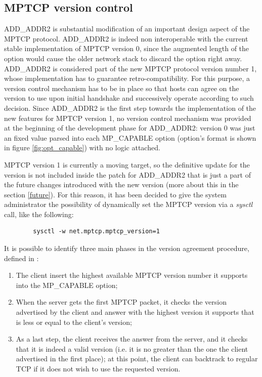 \subsection{MPTCP version control}
\label{retrocomp}
ADD\_ADDR2 is substantial modification of an important design aspect of the MPTCP protocol. ADD\_ADDR2 is indeed non interoperable with the current stable implementation of MPTCP version 0, since the augmented length of the option would cause the older network stack to discard the option right away.
ADD\_ADDR2 is considered part of the new MPTCP protocol version number 1, whose implementation has to guarantee retro-compatibility. For this purpose, a version control mechanism has to be in place so that hosts can agree on the version to use upon initial handshake and successively operate according to such decision. Since ADD\_ADDR2 is the first step towards the implementation of the new features for MPTCP version 1, no version control mechanism was provided at the beginning of the development phase for ADD\_ADDR2: version 0 was just an fixed value parsed into each MP\_CAPABLE option (option's format is shown in figure \ref{fig:opt_capable}) with no logic attached.

MPTCP version 1 is currently a moving target, so the definitive update for the version is not included inside the patch for ADD\_ADDR2 that is just a part of the future changes introduced with the new version (more about this in the section \ref{future}). For this reason, it has been decided to give the system administrator the possibility of dynamically set the MPTCP version via a \textit{sysctl} call, like the following:

\begin{verbatim}
        sysctl -w net.mptcp.mptcp_version=1
\end{verbatim}

It is possible to identify three main phases in the version agreement procedure, defined in :

\begin{enumerate}
  \item The client insert the highest available MPTCP version number it supports into the MP\_CAPABLE option;
  \item When the server gets the first MPTCP packet, it checks the version advertised by the client and answer with the highest version it supports that is less or equal to the client's version;
  \item As a last step, the client receives the answer from the server, and it checks that it is indeed a valid version (i.e. it is no greater than the one the client advertised in the first place); at this point, the client can backtrack to regular TCP if it does not wish to use the requested version.
\end{enumerate}

